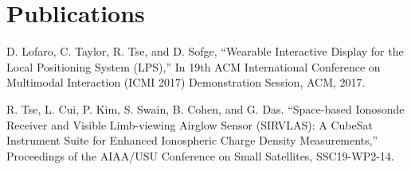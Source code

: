 \documentclass[]{deedy-resume-openfont}
\begin{document}
\begin{minipage}[t]{0.66\textwidth}
\section{Publications}
\vspace{0.75cm}

\begin{thebibliography}{2}
D. Lofaro, C. Taylor, R. Tse, and D. Sofge, “Wearable Interactive Display for the Local Positioning System (LPS),” In 19th ACM International Conference on Multimodal Interaction (ICMI 2017) Demonstration Session, ACM, 2017.

R. Tse, L. Cui, P. Kim, S. Swain, B. Cohen, and G. Das. “Space-based Ionosonde Receiver and Visible Limb-viewing Airglow Sensor (SIRVLAS): A CubeSat Instrument Suite for Enhanced Ionospheric Charge Density Measurements,” Proceedings of the AIAA/USU Conference on Small Satellites, SSC19-WP2-14.
 
\end{thebibliography}

\end{minipage} 
\end{document}
